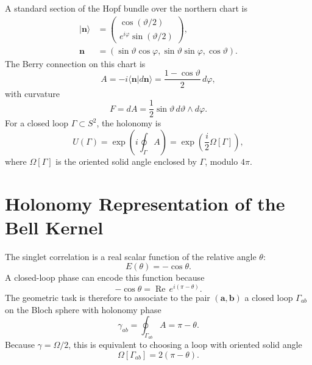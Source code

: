 \documentclass[
  aps,
  pra,
  reprint,
  superscriptaddress,
  nofootinbib,
  longbibliography,
  floatfix,
  amsmath,
  amssymb
]{revtex4-2}
\theoremstyle{plain}
\theoremstyle{definition}
\theoremstyle{remark}
\newcommand{\ket}[1]{\lvert #1\rangle}
\newcommand{\braket}[2]{\langle #1\vert #2\rangle}
\begin{document}
A standard section of the Hopf bundle over the northern chart is
\begin{align}
\ket{\bm n}&=\begin{pmatrix}
\cos(\vartheta/2)\\
e^{i\varphi}\sin(\vartheta/2)
\end{pmatrix},\nonumber\\
\bm n&=(\sin\vartheta\cos\varphi,\sin\vartheta\sin\varphi,\cos\vartheta).
\label{eq:spinorsection}
\end{align}
The Berry connection on this chart is
\begin{equation}
A=-i\braket{\bm n}{d\bm n}
=\frac{1-\cos\vartheta}{2}\,d\varphi,
\label{eq:berryA}
\end{equation}
with curvature
\begin{equation}
F=dA=\frac12\sin\vartheta\,d\vartheta\wedge d\varphi.
\label{eq:berryF}
\end{equation}
For a closed loop \(\Gamma\subset S^2\), the holonomy is
\begin{equation}
U(\Gamma)=\exp\left(i\oint_\Gamma A\right)
=\exp\left(\frac{i}{2}\Omega[\Gamma]\right),
\label{eq:berryholonomy}
\end{equation}
where \(\Omega[\Gamma]\) is the oriented solid angle enclosed by \(\Gamma\), modulo \(4\pi\).

\section{Holonomy Representation of the Bell Kernel}
\label{sec:holonomy}

The singlet correlation is a real scalar function of the relative angle \(\theta\):
\begin{equation}
E(\theta)=-\cos\theta.
\end{equation}
A closed-loop phase can encode this function because
\begin{equation}
-\cos\theta=\operatorname{Re}\,e^{i(\pi-\theta)}.
\label{eq:phasekernel}
\end{equation}
The geometric task is therefore to associate to the pair \((\bm a,\bm b)\) a closed loop \(\Gamma_{ab}\) on the Bloch sphere with holonomy phase
\begin{equation}
\gamma_{ab}=\oint_{\Gamma_{ab}} A=\pi-\theta.
\label{eq:gammabell}
\end{equation}
Because \(\gamma=\Omega/2\), this is equivalent to choosing a loop with oriented solid angle
\begin{equation}
\Omega[\Gamma_{ab}]=2(\pi-\theta).
\label{eq:solidangle}
\end{equation}
\end{document}
